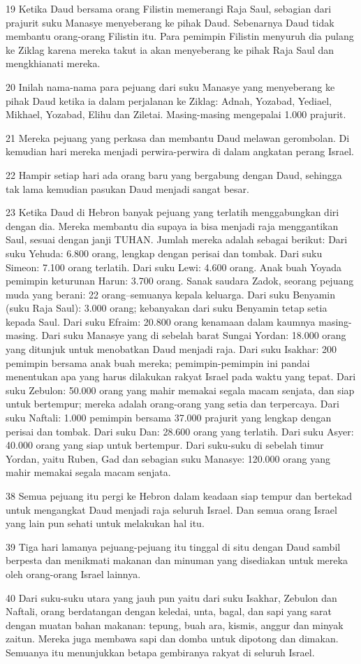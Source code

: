 \par 19 Ketika Daud bersama orang Filistin memerangi Raja Saul, sebagian dari prajurit suku Manasye menyeberang ke pihak Daud. Sebenarnya Daud tidak membantu orang-orang Filistin itu. Para pemimpin Filistin menyuruh dia pulang ke Ziklag karena mereka takut ia akan menyeberang ke pihak Raja Saul dan mengkhianati mereka.
\par 20 Inilah nama-nama para pejuang dari suku Manasye yang menyeberang ke pihak Daud ketika ia dalam perjalanan ke Ziklag: Adnah, Yozabad, Yediael, Mikhael, Yozabad, Elihu dan Ziletai. Masing-masing mengepalai 1.000 prajurit.
\par 21 Mereka pejuang yang perkasa dan membantu Daud melawan gerombolan. Di kemudian hari mereka menjadi perwira-perwira di dalam angkatan perang Israel.
\par 22 Hampir setiap hari ada orang baru yang bergabung dengan Daud, sehingga tak lama kemudian pasukan Daud menjadi sangat besar.
\par 23 Ketika Daud di Hebron banyak pejuang yang terlatih menggabungkan diri dengan dia. Mereka membantu dia supaya ia bisa menjadi raja menggantikan Saul, sesuai dengan janji TUHAN. Jumlah mereka adalah sebagai berikut: Dari suku Yehuda: 6.800 orang, lengkap dengan perisai dan tombak. Dari suku Simeon: 7.100 orang terlatih. Dari suku Lewi: 4.600 orang. Anak buah Yoyada pemimpin keturunan Harun: 3.700 orang. Sanak saudara Zadok, seorang pejuang muda yang berani: 22 orang--semuanya kepala keluarga. Dari suku Benyamin (suku Raja Saul): 3.000 orang; kebanyakan dari suku Benyamin tetap setia kepada Saul. Dari suku Efraim: 20.800 orang kenamaan dalam kaumnya masing-masing. Dari suku Manasye yang di sebelah barat Sungai Yordan: 18.000 orang yang ditunjuk untuk menobatkan Daud menjadi raja. Dari suku Isakhar: 200 pemimpin bersama anak buah mereka; pemimpin-pemimpin ini pandai menentukan apa yang harus dilakukan rakyat Israel pada waktu yang tepat. Dari suku Zebulon: 50.000 orang yang mahir memakai segala macam senjata, dan siap untuk bertempur; mereka adalah orang-orang yang setia dan terpercaya. Dari suku Naftali: 1.000 pemimpin bersama 37.000 prajurit yang lengkap dengan perisai dan tombak. Dari suku Dan: 28.600 orang yang terlatih. Dari suku Asyer: 40.000 orang yang siap untuk bertempur. Dari suku-suku di sebelah timur Yordan, yaitu Ruben, Gad dan sebagian suku Manasye: 120.000 orang yang mahir memakai segala macam senjata.
\par 38 Semua pejuang itu pergi ke Hebron dalam keadaan siap tempur dan bertekad untuk mengangkat Daud menjadi raja seluruh Israel. Dan semua orang Israel yang lain pun sehati untuk melakukan hal itu.
\par 39 Tiga hari lamanya pejuang-pejuang itu tinggal di situ dengan Daud sambil berpesta dan menikmati makanan dan minuman yang disediakan untuk mereka oleh orang-orang Israel lainnya.
\par 40 Dari suku-suku utara yang jauh pun yaitu dari suku Isakhar, Zebulon dan Naftali, orang berdatangan dengan keledai, unta, bagal, dan sapi yang sarat dengan muatan bahan makanan: tepung, buah ara, kismis, anggur dan minyak zaitun. Mereka juga membawa sapi dan domba untuk dipotong dan dimakan. Semuanya itu menunjukkan betapa gembiranya rakyat di seluruh Israel.

